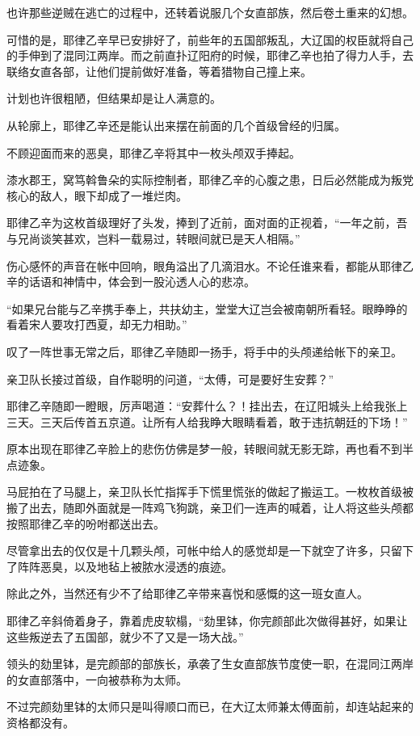 也许那些逆贼在逃亡的过程中，还转着说服几个女直部族，然后卷土重来的幻想。

可惜的是，耶律乙辛早已安排好了，前些年的五国部叛乱，大辽国的权臣就将自己的手伸到了混同江两岸。而之前直扑辽阳府的时候，耶律乙辛也拍了得力人手，去联络女直各部，让他们提前做好准备，等着猎物自己撞上来。

计划也许很粗陋，但结果却是让人满意的。

从轮廓上，耶律乙辛还是能认出来摆在前面的几个首级曾经的归属。

不顾迎面而来的恶臭，耶律乙辛将其中一枚头颅双手捧起。

漆水郡王，窝笃斡鲁朵的实际控制者，耶律乙辛的心腹之患，日后必然能成为叛党核心的敌人，眼下却成了一堆烂肉。

耶律乙辛为这枚首级理好了头发，捧到了近前，面对面的正视着，“一年之前，吾与兄尚谈笑甚欢，岂料一载易过，转眼间就已是天人相隔。”

伤心感怀的声音在帐中回响，眼角溢出了几滴泪水。不论任谁来看，都能从耶律乙辛的话语和神情中，体会到一股沁透人心的悲凉。

“如果兄台能与乙辛携手奉上，共扶幼主，堂堂大辽岂会被南朝所看轻。眼睁睁的看着宋人要攻打西夏，却无力相助。”

叹了一阵世事无常之后，耶律乙辛随即一扬手，将手中的头颅递给帐下的亲卫。

亲卫队长接过首级，自作聪明的问道，“太傅，可是要好生安葬？”

耶律乙辛随即一瞪眼，厉声喝道：“安葬什么？！挂出去，在辽阳城头上给我张上三天。三天后传首五京道。让所有人给我睁大眼睛看着，敢于违抗朝廷的下场！”

原本出现在耶律乙辛脸上的悲伤仿佛是梦一般，转眼间就无影无踪，再也看不到半点迹象。

马屁拍在了马腿上，亲卫队长忙指挥手下慌里慌张的做起了搬运工。一枚枚首级被搬了出去，随即外面就是一阵鸡飞狗跳，亲卫们一连声的喊着，让人将这些头颅都按照耶律乙辛的吩咐都送出去。

尽管拿出去的仅仅是十几颗头颅，可帐中给人的感觉却是一下就空了许多，只留下了阵阵恶臭，以及地毡上被脓水浸透的痕迹。

除此之外，当然还有少不了给耶律乙辛带来喜悦和感慨的这一班女直人。

耶律乙辛斜倚着身子，靠着虎皮软榻，“劾里钵，你完颜部此次做得甚好，如果让这些叛逆去了五国部，就少不了又是一场大战。”

领头的劾里钵，是完颜部的部族长，承袭了生女直部族节度使一职，在混同江两岸的女直部落中，一向被恭称为太师。

不过完颜劾里钵的太师只是叫得顺口而已，在大辽太师兼太傅面前，却连站起来的资格都没有。

